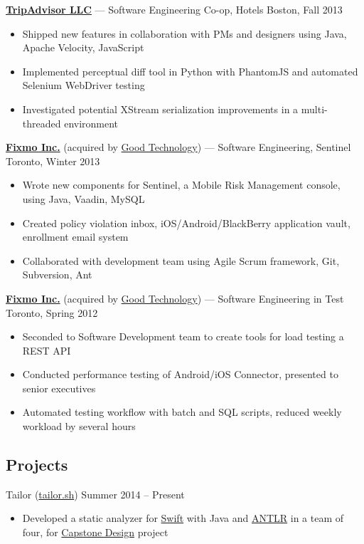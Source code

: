 \documentclass[pdftex,11pt,letterpaper]{article}
\begin{document}
\href{http://tripadvisor.com}{\textbf{TripAdvisor LLC}} --- Software Engineering Co-op, Hotels \hfill {\color{gray} Boston, Fall 2013}
\begin{itemize}
  \item Shipped new features in collaboration with PMs and designers using Java, Apache Velocity, JavaScript
  \item Implemented perceptual diff tool in Python with PhantomJS and automated Selenium WebDriver testing
  \item Investigated potential XStream serialization improvements in a multi-threaded environment
\end{itemize}

\href{https://www1.good.com/about/press-releases/good-technology-acquires-fixmo-security-business.html}{\textbf{Fixmo Inc.}} (acquired by \href{https://good.com}{Good Technology}) --- Software Engineering, Sentinel \hfill {\color{gray} Toronto, Winter 2013}
\begin{itemize}
  \item Wrote new components for Sentinel, a Mobile Risk Management console, using Java, Vaadin, MySQL
  \item Created policy violation inbox, iOS/Android/BlackBerry application vault, enrollment email system
  \item Collaborated with development team using Agile Scrum framework, Git, Subversion, Ant
\end{itemize}

\href{https://www1.good.com/about/press-releases/good-technology-acquires-fixmo-security-business.html}{\textbf{Fixmo Inc.}} (acquired by \href{https://good.com}{Good Technology}) --- Software Engineering in Test \hfill {\color{gray} Toronto, Spring 2012}
\begin{itemize}
  \item Seconded to Software Development team to create tools for load testing a REST API
  \item Conducted performance testing of Android/iOS Connector, presented to senior executives
  \item Automated testing workflow with batch and SQL scripts, reduced weekly workload by several hours
\end{itemize}

\subsection*{Projects}

Tailor (\href{https://tailor.sh}{tailor.sh}) \hfill {\color{gray} Summer 2014 -- Present}
\begin{itemize}
    \item Developed a static analyzer for \href{https://developer.apple.com/swift/}{Swift} with Java and \href{http://www.antlr.org}{ANTLR} in a team of four, for \href{https://uwaterloo.ca/engineering/entrepreneurship/capstone-design/}{Capstone Design} project
\end{itemize}
\end{document}
